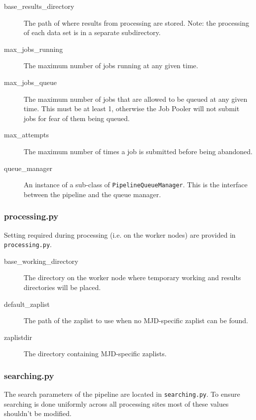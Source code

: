 \documentclass[12pt]{article}
\begin{document}
\begin{description}
    \item[base\_results\_directory] The path of where results from processing are stored. Note: the processing of each data set is in a separate subdirectory.
    \item[max\_jobs\_running] The maximum number of jobs running at any given time.
    \item[max\_jobs\_queue] The maximum number of jobs that are allowed to be queued at any given time. This must be at least 1, otherwise the Job Pooler will not submit jobs for fear of them being queued.
    \item[max\_attempts] The maximum number of times a job is submitted before being abandoned.
    \item[queue\_manager] An instance of a sub-class of \texttt{PipelineQueueManager}. This is the interface between the pipeline and the queue manager.
\end{description}

\subsubsection{processing.py}
Setting required during processing (i.e. on the worker nodes) are provided in \texttt{processing.py}.

\begin{description}
    \item[base\_working\_directory] The directory on the worker node where temporary working and results directories will be placed.
    \item[default\_zaplist] The path of the zaplist to use when no MJD-specific zaplist can be found.
    \item[zaplistdir] The directory containing MJD-specific zaplists.
\end{description}


\subsubsection{searching.py}
The search parameters of the pipeline are located in \texttt{searching.py}. To ensure searching is done uniformly across all processing sites most of these values shouldn't be modified.
\end{document}
